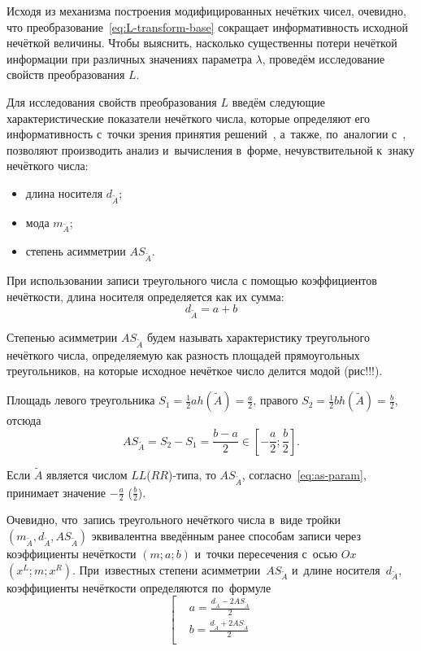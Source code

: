 Исходя из механизма построения модифицированных нечётких чисел, очевидно, что преобразование~\eqref{eq:L-transform-base} сокращает информативность исходной нечёткой величины. Чтобы выяснить, насколько существенны потери нечёткой информации при различных значениях параметра $\lambda$, проведём исследование свойств преобразования $L$.

Для исследования свойств преобразования $L$ введём следующие характеристические показатели нечёткого числа, которые определяют его информативность с~точки зрения принятия решений~\cite{Vorontsov_PI, Alushta-1}, а~также, по~аналогии с~\cite{Spesivtsev}, позволяют производить анализ и~вычисления в~форме, нечувствительной к~знаку нечёткого числа:
\begin{itemize}
  \item длина носителя $d_{\tilde A}$;
  \item мода $m_{\tilde A}$;
  \item степень асимметрии $AS_{\tilde A}$.
\end{itemize}

При использовании записи треугольного числа с помощью коэффициентов нечёткости, длина носителя определяется как их сумма:
\begin{equation}
\label{eq:support-length}
  d_{\tilde A}=a+b
\end{equation}

\begin{mydef}
  Степенью асимметрии $AS_{\tilde A}$ будем называть характеристику треугольного нечёткого числа, определяемую как разность площадей прямоугольных треугольников, на которые исходное нечёткое число делится модой (рис!!!).
\end{mydef}
Площадь левого треугольника $\displaystyle S_1=\frac{1}{2}ah(\tilde A)=\frac{a}{2}$, правого $\displaystyle S_2=\frac{1}{2}bh\left(\tilde A \right)=\frac{b}{2}$, отсюда
\begin{equation}
\label{eq:as-param}
  AS_{\tilde A}=S_2-S_1=\frac{b-a}{2}\in \left[ -\frac{a}{2};\frac{b}{2} \right].
\end{equation}

Если $\tilde{A}$ является числом $LL$($RR$)-типа, то $AS_{\tilde A}$, согласно~\eqref{eq:as-param}, принимает значение $\displaystyle -\frac{a}{2}$ ($\displaystyle \frac{b}{2}$).

Очевидно, что~запись треугольного нечёткого числа в~виде тройки $\left(m_{\tilde A}, d_{\tilde A}, AS_{\tilde A} \right)$ эквивалентна введённым ранее способам записи через коэффициенты нечёткости $\left( m;a;b \right)$ и~точки пересечения с~осью $Ox$ $\left( x^L;m;x^R \right)$. При~известных степени асимметрии~$AS_{\tilde A}$ и~длине носителя~$d_{\tilde A}$, коэффициенты нечёткости определяются по~формуле
\begin{equation}
\label{eq:mdas-to-abm}
	\left[ \begin{aligned}
      & a=\frac{d_{\tilde A}-2AS_{\tilde A}}{2} \\ 
      & b=\frac{d_{\tilde A}+2AS_{\tilde A}}{2} \\ 
    \end{aligned} \right.
\end{equation}

